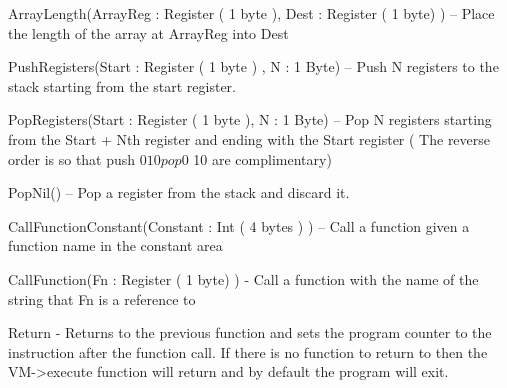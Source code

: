 \documentclass[]{final_report}
\begin{document}
ArrayLength(ArrayReg : Register ( 1 byte ), Dest : Register ( 1 byte) ) – Place the length of the
array at ArrayReg into Dest

PushRegisters(Start : Register ( 1 byte ) , N : 1 Byte) – Push N registers to the stack starting from
the start register.

PopRegisters(Start : Register ( 1 byte ), N : 1 Byte) – Pop N registers starting from the Start + Nth
register and ending with the Start register ( The reverse order is so that push $0 10 pop $0 10 are
complimentary)

PopNil() – Pop a register from the stack and discard it.

CallFunctionConstant(Constant : Int ( 4 bytes ) ) – Call a function given a function name in the
constant area

CallFunction(Fn : Register ( 1 byte) ) - Call a function with the name of the string that Fn is a
reference to

Return - Returns to the previous function and sets the program counter to the instruction after the
function call. If there is no function to return to then the VM->execute function will return and by default the program will exit.

\newpage
\begin{thebibliography}{99}
\end{thebibliography}
\label{endpage}
\end{document}
